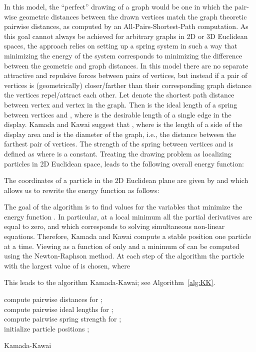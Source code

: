 \documentclass[notitlepage,letter,11pt]{article}
\begin{document}
In this model, the ``perfect'' drawing of a graph would be one in
which the pair-wise geometric distances between the drawn vertices
match the graph theoretic pairwise distances, as computed by an
All-Pairs-Shortest-Path computation. As this goal cannot always be
achieved for arbitrary graphs in 2D or 3D Euclidean spaces, the
approach relies on setting up a spring system in such a way that
minimizing the energy of the system corresponds to minimizing the
difference between the geometric and graph distances. In this model
there are no separate attractive and repulsive forces between pairs of
vertices, but instead if a pair of vertices is (geometrically)
closer/farther than their corresponding graph distance the vertices
repel/attract each other. Let  denote the shortest path
distance between vertex  and vertex  in the graph. Then
 is the ideal length of a spring between
vertices  and , where  is the desirable length of a single
edge in the display. Kamada and Kawai suggest that , where  is the length of a side of the display area and
 is the diameter of the graph, i.e., the distance
between the farthest pair of vertices. The strength of the spring
between vertices  and  is defined as 
where  is a constant. Treating the drawing problem as
localizing  particles  in 2D Euclidean
space, leads to the following overall energy function:


The coordinates of a particle  in the 2D Euclidean plane are given by  and  which allows us to rewrite the energy function as follows:


The goal of the algorithm is to find values for the variables that
minimize the energy function . In
particular, at a local minimum all the partial derivatives are equal
to zero, and which corresponds to solving  simultaneous non-linear
equations. Therefore, Kamada and Kawai compute a stable position one
particle  at a time. Viewing  as a function of only  and
 a minimum of  can be computed using the Newton-Raphson
method. At each step of the algorithm the particle  with the largest value of  is chosen, where

This leads to the algorithm Kamada-Kawai; see Algorithm~\ref{alg:KK}.

\begin{algorithm}
compute pairwise distances  for ;\\
compute pairwise ideal lengths  for ;\\
compute pairwise spring strength  for ;\\
initialize particle positions ;\\
\caption{Kamada-Kawai\label{alg:KK}}
\end{algorithm}
\end{document}
